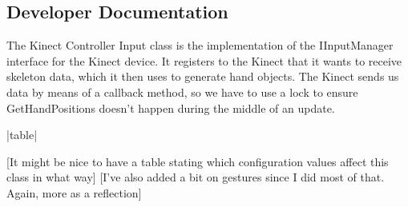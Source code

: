 \subsection{Developer Documentation}
The Kinect Controller Input class is the implementation of the IInputManager interface for the Kinect device. It registers to the Kinect that it wants to receive skeleton data, which it then uses to generate hand objects. The Kinect sends us data by means of a callback method, so we have to use a lock to ensure GetHandPositions doesn't happen during the middle of an update.

|table|

[It might be nice to have a table stating which configuration values affect this class in what way]
[I've also added a bit on gestures since I did most of that. Again, more as a reflection]


